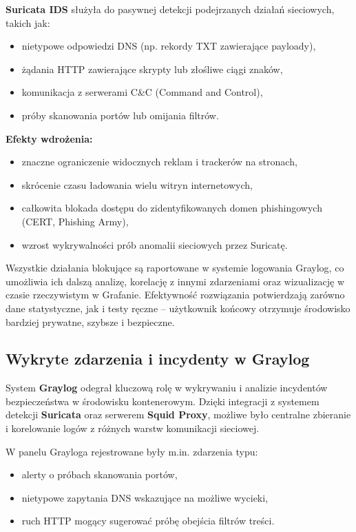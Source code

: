 \documentclass[
    left=2.5cm,         %
    right=2.5cm,        %
    top=2.5cm,          %
    bottom=3cm,         %
    bindingoffset=6mm,  %
    nohyphenation=true %
]{eiti/eiti-thesis} %
\begin{document}
\textbf{Suricata IDS} służyła do pasywnej detekcji podejrzanych działań sieciowych, takich jak:
\begin{itemize}
    \item nietypowe odpowiedzi DNS (np. rekordy TXT zawierające payloady),
    \item żądania HTTP zawierające skrypty lub złośliwe ciągi znaków,
    \item komunikacja z serwerami C\&C (Command and Control),
    \item próby skanowania portów lub omijania filtrów.
\end{itemize}

\textbf{Efekty wdrożenia:}
\begin{itemize}
    \item znaczne ograniczenie widocznych reklam i trackerów na stronach,
    \item skrócenie czasu ładowania wielu witryn internetowych,
    \item całkowita blokada dostępu do zidentyfikowanych domen phishingowych (CERT, Phishing Army),
    \item wzrost wykrywalności prób anomalii sieciowych przez Suricatę.
\end{itemize}

Wszystkie działania blokujące są raportowane w systemie logowania Graylog, co umożliwia ich dalszą analizę, korelację z innymi zdarzeniami oraz wizualizację w czasie rzeczywistym w Grafanie. Efektywność rozwiązania potwierdzają zarówno dane statystyczne, jak i testy ręczne – użytkownik końcowy otrzymuje środowisko bardziej prywatne, szybsze i bezpieczne.

\newpage
\subsection{Wykryte zdarzenia i incydenty w Graylog}

System \textbf{Graylog} odegrał kluczową rolę w wykrywaniu i analizie incydentów bezpieczeństwa w środowisku kontenerowym. Dzięki integracji z systemem detekcji \textbf{Suricata} oraz serwerem \textbf{Squid Proxy}, możliwe było centralne zbieranie i korelowanie logów z różnych warstw komunikacji sieciowej.

W panelu Grayloga rejestrowane były m.in. zdarzenia typu:
\begin{itemize}
\item alerty o próbach skanowania portów,
\item nietypowe zapytania DNS wskazujące na możliwe wycieki,
\item ruch HTTP mogący sugerować próbę obejścia filtrów treści.
\end{itemize}
\end{document}
